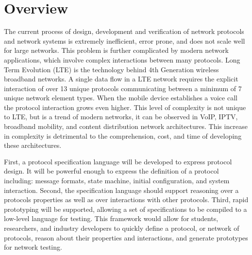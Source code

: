 \section{Overview}

The current process of design, development and verification of network protocols
and network systems is extremely inefficient, error prone, and does not scale
well for large networks. This problem is further complicated by modern network
applications, which
involve complex interactions between many protocols. Long Term
Evolution (LTE) is the technology behind 4th Generation wireless broadband
networks. A single data flow in a LTE network requires the explicit interaction
of over 13 unique protocols communicating between a minimum of 7 unique network
element types. When the mobile device establishes a voice call the protocol
interaction grows even higher. This level of complexity is not unique to LTE,
but is a trend of modern networks, it can be observed in VoIP, IPTV, broadband
mobility, and content distribution network architectures. This increase in
complexity is detrimental to the comprehension, cost, and time of developing
these architectures. 

First, a protocol specification language will be developed to express protocol
design. It will be powerful enough to express the definition of a protocol
including: message formats, state machine, initial configuration, and system
interaction. Second, the specification language should support reasoning over a
protocols properties as well as over interactions with other protocols. Third,
rapid prototyping will be supported, allowing a set of specifications to be
compiled to a low-level language for testing. This framework would allow for
students, researchers, and industry developers to quickly define a protocol, or
network of protocols, reason about their properties and interactions, and
generate prototypes for network testing.

